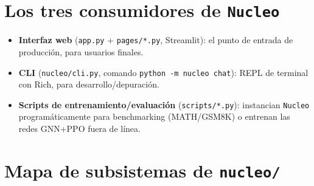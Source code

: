 \documentclass[11pt,a4paper]{report}
\newcommand{\code}[1]{\texttt{#1}}
\begin{document}
\section{Los tres consumidores de \code{Nucleo}}

\begin{itemize}
  \item \textbf{Interfaz web} (\code{app.py} + \code{pages/*.py}, Streamlit): el punto de entrada de producci\'on, para usuarios finales.
  \item \textbf{CLI} (\code{nucleo/cli.py}, comando \code{python -m nucleo chat}): REPL de terminal con Rich, para desarrollo/depuraci\'on.
  \item \textbf{Scripts de entrenamiento/evaluaci\'on} (\code{scripts/*.py}): instancian \code{Nucleo} program\'aticamente para benchmarking (MATH/GSM8K) o entrenan las redes GNN+PPO fuera de l\'inea.
\end{itemize}

\section{Mapa de subsistemas de \code{nucleo/}}
\end{document}
